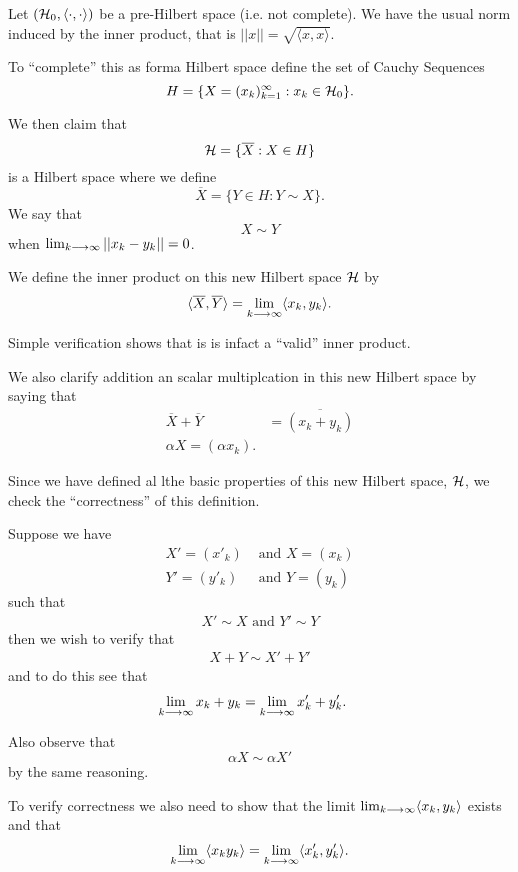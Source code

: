 \documentclass{unswmaths}
\begin{document}
Let $( \mathcal{H}_0, \langle \cdot, \cdot \rangle )$ be a pre-Hilbert space (i.e. not complete). 
We have the usual norm induced by the inner product, that is $ ||x|| = \sqrt{ \langle x, x \rangle } $.

To ``complete'' this as forma Hilbert space define the set of Cauchy Sequences
$$
	H = \{ X = (x_k)_{k=1}^\infty : x_k \in \mathcal{H}_0 \}.
$$

We then claim that $$ \mathcal{H} = \{ \overline{X} : X \in H \} $$ is a Hilbert space where we define
$$ \overline{X} = \{ Y \in H : Y \sim X \}. $$ We say that $$ X \sim Y $$ when $ \lim_{k \longrightarrow \infty} ||x_k - y_k|| = 0 $.

We define the inner product on this new Hilbert space $ \mathcal{H} $ by 
$$
	\langle \overline{X}, \overline{Y} \rangle = \lim_{k \longrightarrow \infty} \langle x_k, y_k \rangle. 
$$

Simple verification shows that is is infact a ``valid'' inner product.

We also clarify addition an scalar multiplcation in this new Hilbert space by saying that
\begin{align*}
	\overline{X} + \overline{Y} &= \overline{(x_k + y_k)} \\
	\alpha X = (\alpha x_k ).
\end{align*}


Since we have defined al lthe basic properties of this new Hilbert space, $ \mathcal{H} $, we check the ``correctness''
of this definition. 

Suppose we have
\begin{align*}
	X' = (x'_k) &\text{ and } X = (x_k) \\
	Y' = (y'_k) &\text{ and } Y = (y_k)
\end{align*}
such that
\begin{align*}
	X' \sim X \text{ and } Y' \sim Y
\end{align*}
then we wish to verify that
\begin{align*}
	X + Y \sim X' + Y' 
\end{align*}
and to do this see that
\begin{align*}
	\lim_{k \longrightarrow \infty} x_k + y_k &= \lim_{k \longrightarrow \infty} x'_k + y'_k.
\end{align*}

Also observe that
$$
	\alpha X \sim \alpha X'
$$
by the same reasoning.

To verify correctness we also need to show that the limit $ \lim_{k \longrightarrow \infty} \langle x_k , y_k \rangle $ exists
and that
$$
	\lim_{k \longrightarrow \infty} \langle x_k y_k \rangle = \lim_{ k \longrightarrow \infty } \langle x'_k, y'_k \rangle.
$$
\end{document}
